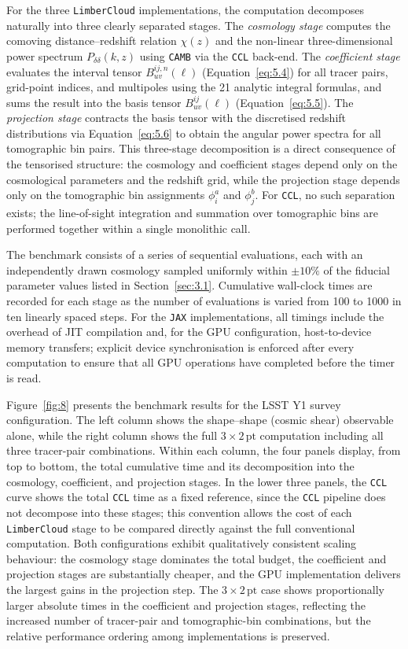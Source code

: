 For the three \texttt{LimberCloud} implementations, the computation decomposes naturally into three clearly separated stages. The \textit{cosmology stage} computes the comoving distance--redshift relation \(\chi(z)\) and the non-linear three-dimensional power spectrum \(P_{\delta\delta}(k, z)\) using \texttt{CAMB} via the \texttt{CCL} back-end. The \textit{coefficient stage} evaluates the interval tensor \(B_{uv}^{ij,n}(\ell)\) (Equation~\ref{eq:5.4}) for all tracer pairs, grid-point indices, and multipoles using the 21 analytic integral formulas, and sums the result into the basis tensor \(B_{uv}^{ij}(\ell)\) (Equation~\ref{eq:5.5}). The \textit{projection stage} contracts the basis tensor with the discretised redshift distributions via Equation~\ref{eq:5.6} to obtain the angular power spectra for all tomographic bin pairs. This three-stage decomposition is a direct consequence of the tensorised structure: the cosmology and coefficient stages depend only on the cosmological parameters and the redshift grid, while the projection stage depends only on the tomographic bin assignments \(\phi^a_i\) and \(\phi^b_j\). For \texttt{CCL}, no such separation exists; the line-of-sight integration and summation over tomographic bins are performed together within a single monolithic call.

The benchmark consists of a series of sequential evaluations, each with an independently drawn cosmology sampled uniformly within \(\pm 10\%\) of the fiducial parameter values listed in Section~\ref{sec:3.1}. Cumulative wall-clock times are recorded for each stage as the number of evaluations is varied from 100 to 1000 in ten linearly spaced steps. For the \texttt{JAX} implementations, all timings include the overhead of JIT compilation and, for the GPU configuration, host-to-device memory transfers; explicit device synchronisation is enforced after every computation to ensure that all GPU operations have completed before the timer is read.

Figure~\ref{fig:8} presents the benchmark results for the LSST Y1 survey configuration. The left column shows the shape--shape (cosmic shear) observable alone, while the right column shows the full \(3\times2\,\mathrm{pt}\) computation including all three tracer-pair combinations. Within each column, the four panels display, from top to bottom, the total cumulative time and its decomposition into the cosmology, coefficient, and projection stages. In the lower three panels, the \texttt{CCL} curve shows the total \texttt{CCL} time as a fixed reference, since the \texttt{CCL} pipeline does not decompose into these stages; this convention allows the cost of each \texttt{LimberCloud} stage to be compared directly against the full conventional computation. Both configurations exhibit qualitatively consistent scaling behaviour: the cosmology stage dominates the total budget, the coefficient and projection stages are substantially cheaper, and the GPU implementation delivers the largest gains in the projection step. The \(3\times2\,\mathrm{pt}\) case shows proportionally larger absolute times in the coefficient and projection stages, reflecting the increased number of tracer-pair and tomographic-bin combinations, but the relative performance ordering among implementations is preserved.

